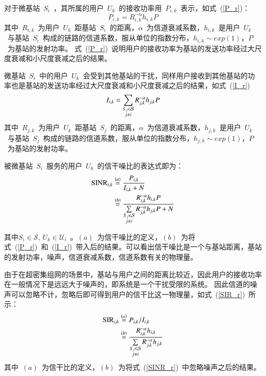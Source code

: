 对于微基站~$S_i$~，其所属的用户~$U_k$~的接收功率用~$P_{i,k}$~表示，如式~(\ref{P_r})：
\begin{equation}\label{P_r}
  P_{i,k} = R_{i,k}^{-\alpha} h_{i,k} P
\end{equation}
其中~$R_{i,k}$~为用户~$U_k$~距基站~$S_i$~的距离，$\alpha$~为信道衰减系数，$h_{i,k}$~是用户~$U_k$~与基站~$S_i$~构成的链路的信道系数，服从单位的指数分布，$h_{i,k}\sim exp(1)$，$P$~为基站的发射功率。
式~(\ref{P_r})~说明用户的接收功率为基站的发送功率经过大尺度衰减和小尺度衰减之后的结果。

微基站~$S_i$~中的用户~$U_k$~会受到其他基站的干扰，同样用户接收到其他基站的功率也是基站的发送功率经过大尺度衰减和小尺度衰减之后的结果，如式~(\ref{I_r})~
\begin{equation}\label{I_r}
  I_{i,k} = \sum_{\begin{subarray}{c} S_j\in \mathcal{S}\\ j \neq i\end{subarray}} R_{j,k}^{-\alpha} h_{j,k} P
\end{equation}
其中~$R_{j,k}$~为用户~$U_k$~距基站~$S_j$~的距离，$\alpha$~为信道衰减系数，$h_{j,k}$~是用户~$U_k$~与基站~$S_j$~构成的链路的信道系数，服从单位的指数分布，$h_{j,k}\sim exp(1)$，$P$~为基站的发射功率。

被微基站~$S_i$~服务的用户~$U_k$~的信干噪比的表达式即为：
\begin{equation}\label{SINR_r}
  \begin{aligned}
    \mathrm{SINR}_{i, k}&\overset{(a)}{=}\frac{P_{i,k}}{I_{i,k}+N} \\
                 &\overset{(b)}{=}\frac{R_{i,k}^{-\alpha} h_{i,k} P}{\sum\limits_{\begin{subarray}{c} S_j\in \mathcal{S}\\ j \neq i\end{subarray}} {R_{j,k}^{-\alpha} h_{j,k} P} + N}
  \end{aligned}
\end{equation}

其中$S_i\in\mathcal{S}$, $U_k\in\mathcal{U}_i$~。$(a)$~为信干噪比的定义，$(b)$~为将式~(\ref{P_r})~和~(\ref{I_r})~带入后的结果。可以看出信干噪比是一个与基站距离，基站的发射功率，噪声，信道衰减系数，信道系数有关的物理量。

由于在超密集组网的场景中，基站与用户之间的距离比较近，因此用户的接收功率在一般情况下是远远大于噪声的，即系统是一个干扰受限的系统。
因此信道的噪声可以忽略不计，忽略后即可得到用户的信干比这一物理量，如式~(\ref{SIR_r})~所示：
\begin{equation}\label{SIR_r}
  \begin{aligned}
    \mathrm{SIR}_{i, k}&\overset{(a)}{=}P_{i,k} / I_{i,k} \\
                 &\overset{(b)}{=}\frac{R_{i,k}^{-\alpha} h_{i,k}}{\sum\limits_{\begin{subarray}{c} S_j\in \mathcal{S}\\ j \neq i\end{subarray}} {R_{j,k}^{-\alpha} h_{j,k}}}
  \end{aligned}
\end{equation}
其中~$(a)$~为信干比的定义，$(b)$~为将式~(\ref{SINR_r})~中忽略噪声之后的结果。

